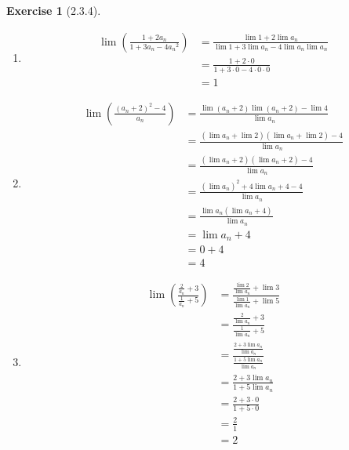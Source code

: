 \documentclass{amsart}
\theoremstyle{definition}
\newtheorem{exercise}{Exercise}
\begin{document}
\begin{exercise}[2.3.4]
  \begin{enumerate}[label={(\alph*)}]
    \item
      \begin{align*}
        \lim\left(\frac{1 + 2a_n}{1 + 3a_n - 4{a_n}^2}\right) &= \frac{\lim{1} +
        2 \lim{a_n}}{\lim{1} + 3 \lim{a_n} - 4 \lim{a_n} \lim{a_n}} \\
        &= \frac{1 + 2 \cdot 0}{ 1 + 3 \cdot 0 - 4 \cdot 0 \cdot 0} \\
        &= 1
      \end{align*}
    \item
      \begin{align*}
        \lim\left(\frac{{(a_n + 2)}^2 - 4}{a_n}\right) &= \frac{\lim(a_n + 2)
        \lim(a_n + 2) - \lim{4}}{\lim{a_n}} \\
        &= \frac{(\lim{a_n} + \lim{2}) (\lim{a_n} + \lim{2}) - 4}{\lim{a_n}} \\
        &= \frac{(\lim{a_n} + 2) (\lim{a_n} + 2) - 4}{\lim{a_n}} \\
        &= \frac{{(\lim{a_n})}^2 + 4 \lim{a_n} + 4 - 4}{\lim{a_n}} \\
        &= \frac{\lim{a_n} (\lim{a_n} + 4)}{\lim{a_n}} \\
        &= \lim{a_n} + 4 \\
        &= 0 + 4 \\
        &= 4
      \end{align*}
    \item
      \begin{align*}
        \lim\left(\frac{\frac{2}{a_n} + 3}{\frac{1}{a_n} + 5}\right) &=
        \frac{\frac{\lim{2}}{\lim{a_n}} + \lim{3}}{\frac{\lim{1}}{\lim{a_n}} +
        \lim{5}} \\
        &= \frac{\frac{2}{\lim{a_n}} + 3}{\frac{1}{\lim{a_n}} + 5} \\
        &= \frac{\frac{2 + 3 \lim{a_n}}{\lim{a_n}}}{\frac{1 + 5
        \lim{a_n}}{\lim{a_n}}} \\
        &= \frac{2 + 3 \lim{a_n}}{1 + 5 \lim{a_n}} \\
        &= \frac{2 + 3 \cdot 0}{1 + 5 \cdot 0} \\
        &= \frac{2}{1} \\
        &= 2
      \end{align*}
  \end{enumerate}
\end{exercise}
\end{document}

